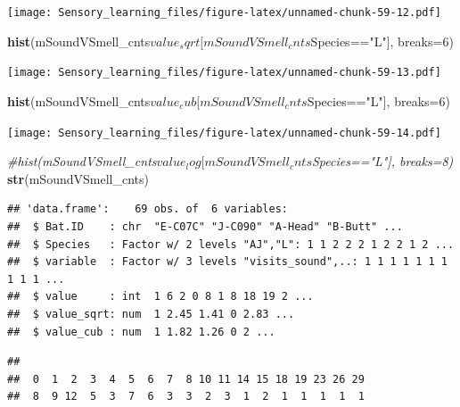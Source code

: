 \documentclass[]{article}
\newenvironment{Shaded}{\begin{snugshade}}{\end{snugshade}}
\newcommand{\KeywordTok}[1]{\textcolor[rgb]{0.13,0.29,0.53}{\textbf{{#1}}}}
\newcommand{\DataTypeTok}[1]{\textcolor[rgb]{0.13,0.29,0.53}{{#1}}}
\newcommand{\DecValTok}[1]{\textcolor[rgb]{0.00,0.00,0.81}{{#1}}}
\newcommand{\StringTok}[1]{\textcolor[rgb]{0.31,0.60,0.02}{{#1}}}
\newcommand{\CommentTok}[1]{\textcolor[rgb]{0.56,0.35,0.01}{\textit{{#1}}}}
\newcommand{\NormalTok}[1]{{#1}}
\begin{document}
\texttt{[image: Sensory\_learning\_files/figure-latex/unnamed-chunk-59-12.pdf]}

\begin{Shaded}
\begin{Highlighting}[]
\KeywordTok{hist}\NormalTok{(mSoundVSmell_cnts$value_sqrt[mSoundVSmell_cnts$Species==}\StringTok{"L"}\NormalTok{], }\DataTypeTok{breaks=}\DecValTok{6}\NormalTok{)}
\end{Highlighting}
\end{Shaded}

\texttt{[image: Sensory\_learning\_files/figure-latex/unnamed-chunk-59-13.pdf]}

\begin{Shaded}
\begin{Highlighting}[]
\KeywordTok{hist}\NormalTok{(mSoundVSmell_cnts$value_cub[mSoundVSmell_cnts$Species==}\StringTok{"L"}\NormalTok{], }\DataTypeTok{breaks=}\DecValTok{6}\NormalTok{)}
\end{Highlighting}
\end{Shaded}

\texttt{[image: Sensory\_learning\_files/figure-latex/unnamed-chunk-59-14.pdf]}

\begin{Shaded}
\begin{Highlighting}[]
\CommentTok{#hist(mSoundVSmell_cnts$value_log[mSoundVSmell_cnts$Species=="L"], breaks=8)}
\KeywordTok{str}\NormalTok{(mSoundVSmell_cnts)}
\end{Highlighting}
\end{Shaded}

\begin{verbatim}
## 'data.frame':    69 obs. of  6 variables:
##  $ Bat.ID    : chr  "E-C07C" "J-C090" "A-Head" "B-Butt" ...
##  $ Species   : Factor w/ 2 levels "AJ","L": 1 1 2 2 2 1 2 2 1 2 ...
##  $ variable  : Factor w/ 3 levels "visits_sound",..: 1 1 1 1 1 1 1 1 1 1 ...
##  $ value     : int  1 6 2 0 8 1 8 18 19 2 ...
##  $ value_sqrt: num  1 2.45 1.41 0 2.83 ...
##  $ value_cub : num  1 1.82 1.26 0 2 ...
\end{verbatim}

\begin{Shaded}
\end{Shaded}

\begin{verbatim}
## 
##  0  1  2  3  4  5  6  7  8 10 11 14 15 18 19 23 26 29 
##  8  9 12  5  3  7  6  3  3  2  3  1  2  1  1  1  1  1
\end{verbatim}
\end{document}
